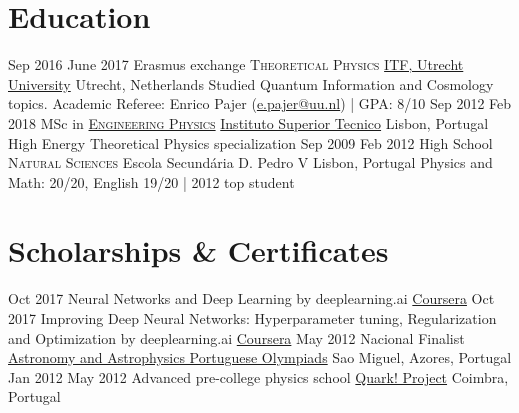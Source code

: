 \documentclass[letterpaper]{twentysecondcv} %
\begin{document}
\section{Education}

\begin{twenty} %
	\twentyitem
    	{Sep 2016}
        {June 2017}
        {Erasmus exchange \@ \textsc{Theoretical Physics}}
        {\href{http://web.science.uu.nl/itf/}{ITF, Utrecht University}}
        {Utrecht, Netherlands}
        {Studied Quantum Information and Cosmology topics.
        Academic Referee: Enrico Pajer (\href{mailto:e.pajer@uu.nl}{e.pajer@uu.nl}) | \normalsize \textsc{GPA}: 8/10}
	\twentyitem
    	{Sep 2012}
		{Feb 2018}
        {MSc in \textsc{\href{https://www.youtube.com/watch?v=0eoa0f5nVA0}{Engineering Physics}} \faYoutubePlay}
        {\href{https://www.youtube.com/watch?v=EGue8EwE3mI}{Instituto Superior Tecnico} \faYoutubePlay}
        {Lisbon, Portugal}
        {High Energy Theoretical Physics specialization}
    \twentyitem
        {Sep 2009}
        {Feb 2012}
        {High School \@ \textsc{Natural Sciences}}
        {Escola Secundária D. Pedro V}
        {Lisbon, Portugal}
        {Physics and Math: 20/20, English 19/20 | 2012 top student}
\end{twenty}

\newpage
\continuesidebar


\section{Scholarships \& Certificates}

\begin{twenty} %
    \twentyitem
        {Oct 2017}
        {}
        {Neural Networks and Deep Learning by deeplearning.ai}
        {\href{https://www.coursera.org/account/accomplishments/records/CF342FNNVUXY}{Coursera}}
        {}
        {}
    \twentyitem
        {Oct 2017}
        {}
        {Improving Deep Neural Networks: Hyperparameter tuning, Regularization and Optimization by deeplearning.ai}
        {\href{https://www.coursera.org/account/accomplishments/records/MQVCJFJ849GK}{Coursera}}
        {}
        {}
    \twentyitem
        {May 2012}
        {}
        {Nacional Finalist}
        {\href{http://www.sp-astronomia.pt/olimpiadas}{Astronomy and Astrophysics Portuguese Olympiads}}
        {Sao Miguel, Azores, Portugal}
        {}
    \twentyitem
        {Jan 2012}
        {May 2012}
        {Advanced pre-college physics school}
        {\href{http://quark.fis.uc.pt/}{Quark! Project}}
        {Coimbra, Portugal}
        {}
\end{twenty}
\end{document}
